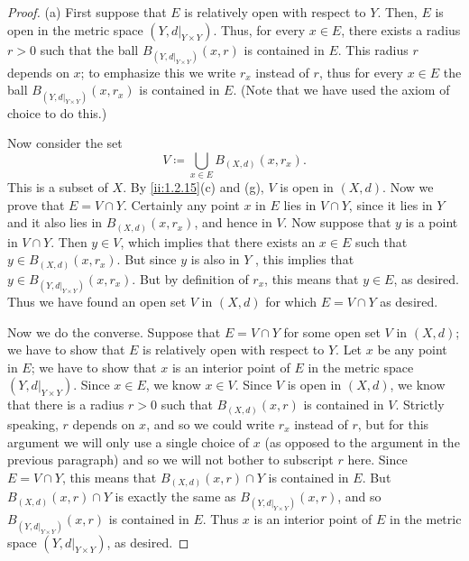 \begin{proof}{(a)}
  First suppose that \(E\) is relatively open with respect to \(Y\).
  Then, \(E\) is open in the metric space \((Y, d|_{Y \times Y})\).
  Thus, for every \(x \in E\), there exists a radius \(r > 0\) such that the ball \(B_{(Y, d|_{Y \times Y})}(x, r)\) is contained in \(E\).
  This radius \(r\) depends on \(x\);
  to emphasize this we write \(r_x\) instead of \(r\), thus for every \(x \in E\) the ball \(B_{(Y, d|_{Y \times Y})}(x, r_x)\) is contained in \(E\).
  (Note that we have used the axiom of choice to do this.)

  Now consider the set
  \[
    V \coloneqq \bigcup_{x \in E} B_{(X, d)}(x, r_x).
  \]
  This is a subset of \(X\).
  By \cref{ii:1.2.15}(c) and (g), \(V\) is open in \((X, d)\).
  Now we prove that \(E = V \cap Y\).
  Certainly any point \(x\) in \(E\) lies in \(V \cap Y\), since it lies in \(Y\) and it also lies in \(B_{(X, d)}(x, r_x)\), and hence in \(V\).
  Now suppose that \(y\) is a point in \(V \cap Y\).
  Then \(y \in V\), which implies that there exists an \(x \in E\) such that \(y \in B_{(X, d)}(x, r_x)\).
  But since \(y\) is also in \(Y\) , this implies that \(y \in B_{(Y, d|_{Y \times Y})}(x, r_x)\).
  But by definition of \(r_x\), this means that \(y \in E\), as desired.
  Thus we have found an open set \(V\) in \((X, d)\) for which \(E = V \cap Y\) as desired.

  Now we do the converse.
  Suppose that \(E = V \cap Y\) for some open set \(V\) in \((X, d)\);
  we have to show that \(E\) is relatively open with respect to \(Y\).
  Let \(x\) be any point in \(E\);
  we have to show that \(x\) is an interior point of \(E\) in the metric space \((Y, d|_{Y \times Y})\).
  Since \(x \in E\), we know \(x \in V\).
  Since \(V\) is open in \((X, d)\), we know that there is a radius \(r > 0\) such that \(B_{(X, d)}(x, r)\) is contained in \(V\).
  Strictly speaking, \(r\) depends on \(x\), and so we could write \(r_x\) instead of \(r\), but for this argument we will only use a single choice of \(x\) (as opposed to the argument in the previous paragraph) and so we will not bother to subscript \(r\) here.
  Since \(E = V \cap Y\), this means that \(B_{(X, d)}(x, r) \cap Y\) is contained in \(E\).
  But \(B_{(X, d)}(x, r) \cap Y\) is exactly the same as \(B_{(Y, d|_{Y \times Y})}(x, r)\), and so \(B_{(Y, d|_{Y \times Y})}(x, r)\) is contained in \(E\).
  Thus \(x\) is an interior point of \(E\) in the metric space \((Y, d|_{Y \times Y})\), as desired.
\end{proof}

